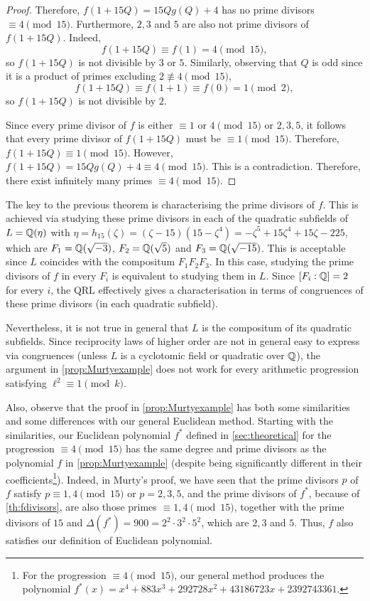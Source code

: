 \documentclass[../main.tex]{subfiles}
\begin{document}
\begin{proof}
	Therefore,  $f(1+15Q)=15Qg(Q)+4$ has no prime divisors $\equiv 4 \pmod{15}$. Furthermore, $2, 3$ and $5$ are also not prime divisors of $f(1+15Q)$. Indeed,
	\begin{equation*}
		f(1+15Q)\equiv f(1)=4 \pmod{15},
	\end{equation*}
	so $f(1+15Q)$ is not divisible by $3$ or $5$. Similarly, observing that $Q$ is odd since it is a product of primes excluding $2\not\equiv 4 \pmod{15}$,
	\begin{equation*}
		f(1+15Q)\equiv f(1+1)\equiv f(0)=1 \pmod{2},
	\end{equation*}
	so $f(1+15Q)$ is not divisible by $2$. 
	
	Since every prime divisor of $f$ is either $\equiv 1$ or $4\pmod{15}$ or $2,3,5$, it follows that every prime divisor of $f(1+15Q)$ must be $\equiv 1 \pmod{15}$. Therefore, $f(1+15Q)\equiv 1 \pmod{15}$. However, $f(1+15Q)=15Qg(Q)+4\equiv 4 \pmod{15}$. This is a contradiction. Therefore, there exist infinitely many primes $\equiv 4 \pmod{15}$.
\end{proof}

	The key to the previous theorem is characterising the prime divisors of $f$. This is achieved via studying these prime divisors in each of the quadratic subfields of $L=\mathbb{Q}(\eta)$ with $\eta=h_{15}(\zeta)=(\zeta-15)(15-\zeta^4)=-\zeta^5+15\zeta^4+15\zeta-225$, which are $F_1=\mathbb{Q}(\sqrt{-3})$, $F_2=\mathbb{Q}(\sqrt{5})$ and $F_3=\mathbb{Q}(\sqrt{-15})$. This is acceptable since $L$ coincides with the compositum $F_1F_2F_3$. In this case, studying the prime divisors of $f$ in every $F_i$ is equivalent to studying them in $L$. Since $[F_i:\mathbb{Q}]=2$ for every $i$, the QRL effectively gives a characterisation in terms of congruences of these prime divisors (in each quadratic subfield). 
	
	Nevertheless, it is not true in general that $L$ is the compositum of its quadratic subfields. Since reciprocity laws of higher order are not in general easy to express via congruences (unless $L$ is a cyclotomic field or quadratic over $\mathbb{Q}$), the argument in \cref{prop:Murtyexample} does not work for every arithmetic progression satisfying $\ell^2\equiv 1\pmod{k}$. 
	
	Also, observe that the proof in \cref{prop:Murtyexample} has both some similarities and some differences with our general Euclidean method. Starting with the similarities, our Euclidean polynomial $f^*$ defined in \cref{sec:theoretical} for the progression $\equiv 4\pmod{15}$ has the same degree and prime divisors as the polynomial $f$ in  \cref{prop:Murtyexample} (despite being significantly different in their coefficients\footnote{For the progression $\equiv 4 \pmod{15}$, our general method produces the polynomial $f^*(x)=x^{4} + 883 x^{3} + 292728 x^{2} + 43186723 x + 2392743361$.}). Indeed, in Murty's proof, we have seen that the prime divisors $p$ of $f$ satisfy $p\equiv 1, 4 \pmod{15}$ or $p=2, 3, 5$, and the prime divisors of $f^*$, because of \cref{th:fdivisors}, are also those primes $\equiv 1, 4 \pmod{15}$, together with the prime divisors of $15$ and $\Delta(f^*)=900=2^2\cdot3^2\cdot5^2$, which are $2, 3$ and $5$. Thus, $f$ also satisfies our definition of Euclidean polynomial.
	
\end{document}
